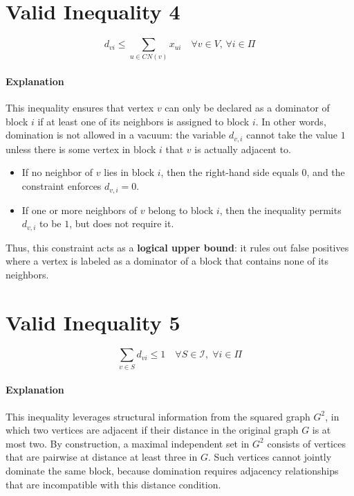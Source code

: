 \section{Valid Inequality 4}
\begin{equation}
    d_{vi} \leq \sum_{u \in CN(v)} x_{ui} \quad \forall v \in V,\, \forall i \in \Pi
\end{equation}
\paragraph{Explanation} This inequality ensures that vertex $v$ can only be declared as a dominator of block $i$ if at least one of its neighbors is assigned to block $i$. In other words, domination is not allowed in a vacuum: the variable $d_{v,i}$ cannot take the value $1$ unless there is some vertex in block $i$ that $v$ is actually adjacent to.  
 
\begin{itemize}

    \item If no neighbor of $v$ lies in block $i$, then the right-hand side equals $0$, and the constraint enforces $d_{v,i}=0$.

    \item If one or more neighbors of $v$ belong to block $i$, then the inequality permits $d_{v,i}$ to be $1$, but does not require it.

\end{itemize}
 
Thus, this constraint acts as a \textbf{logical upper bound}: it rules out false positives where a vertex is labeled as a dominator of a block that contains none of its neighbors.
 

\section{Valid Inequality 5}
\begin{equation}
    \sum_{v \in S} d_{vi} \leq 1 \quad \forall S \in \mathcal{I},\; \forall i \in \Pi
\end{equation}
\paragraph{Explanation} This inequality leverages structural information from the squared graph $G^2$, in which two vertices are adjacent if their distance in the original graph $G$ is at most two. By construction, a maximal independent set in $G^2$ consists of vertices that are pairwise at distance at least three in $G$. Such vertices cannot jointly dominate the same block, because domination requires adjacency relationships that are incompatible with this distance condition.  
 
